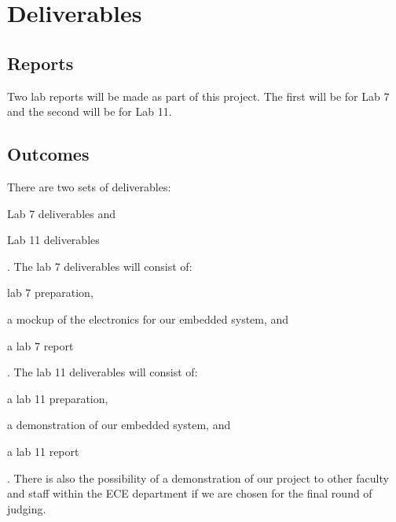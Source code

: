 \documentclass{article}
\begin{document}
\section{Deliverables}

	\subsection{Reports}
		Two lab reports will be made as part of this project. The first will be for Lab 7 and the second will be for Lab 11.
	\subsection{Outcomes}
		There are two sets of deliverables:
		\begin{inlinelist}
			\item Lab 7 deliverables and
			\item Lab 11 deliverables
		\end{inlinelist}.
		The lab 7 deliverables will consist of:
		\begin{inlinelist}
			\item lab 7 preparation,
			\item a mockup of the electronics for our embedded system, and
			\item a lab 7 report
		\end{inlinelist}.
		The lab 11 deliverables will consist of:
		\begin{inlinelist}
			\item a lab 11 preparation,
			\item a demonstration of our embedded system, and
			\item a lab 11 report
		\end{inlinelist}. There is also the possibility of a demonstration of our project to other faculty and staff within the ECE department if we are chosen for the final round of judging.
\end{document}
